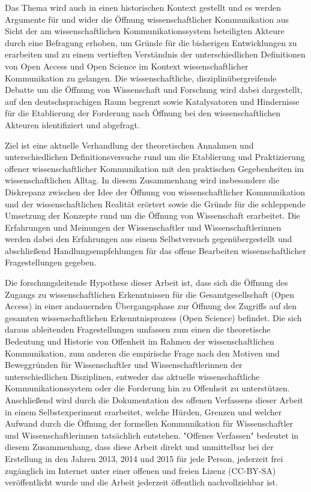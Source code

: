 Das Thema wird auch in einen historischen Kontext gestellt und es werden Argumente für und wider die Öffnung wissenschaftlicher Kommunikation aus Sicht der am wissenschaftlichen Kommunikationssystem beteiligten Akteure durch eine Befragung erhoben, um Gründe für die bisherigen Entwicklungen zu erarbeiten und zu einem vertieften Verständnis der unterschiedlichen Definitionen von Open Access und Open Science im Kontext wissenschaftlicher Kommunikation zu gelangen. Die wissenschaftliche, disziplinübergreifende Debatte um die Öffnung von Wissenschaft und Forschung wird dabei dargestellt, auf den deutschsprachigen Raum begrenzt sowie Katalysatoren und Hindernisse für die Etablierung der Forderung nach Öffnung bei den wissenschaftlichen Akteuren identifiziert und abgefragt.

Ziel ist eine aktuelle Verhandlung der theoretischen Annahmen und unterschiedlichen Definitionsversuche rund um die Etablierung und Praktizierung offener wissenschaftlicher Kommunikation mit den praktischen Gegebenheiten im wissenschaftlichen Alltag. In diesem Zusammenhang wird insbesondere die Diskrepanz zwischen der Idee der Öffnung von wissenschaftlicher Kommunikation und der wissenschaftlichen Realität \cite{Scheliga_2014} erörtert sowie die Gründe für die schleppende Umsetzung der Konzepte rund um die Öffnung von Wissenschaft erarbeitet. Die Erfahrungen und Meinungen der Wissenschaftler und Wissenschaftlerinnen werden dabei den Erfahrungen aus einem Selbstversuch gegenübergestellt und abschließend Handlungsempfehlungen für das offene Bearbeiten wissenschaftlicher Fragestellungen gegeben.

Die forschungsleitende Hypothese dieser Arbeit ist, dass sich die Öffnung des Zugangs zu wissenschaftlichen Erkenntnissen für die Gesamtgesellschaft (Open Access) in einer andauernden Übergangsphase zur Öffnung des Zugriffs auf den gesamten wissenschaftlichen Erkenntnisprozess (Open Science) befindet. Die sich daraus ableitenden Fragestellungen umfassen zum einen die theoretische Bedeutung und Historie von Offenheit im Rahmen der wissenschaftlichen Kommunikation, zum anderen die empirische Frage nach den Motiven und Beweggründen für Wissenschaftler und Wissenschaftlerinnen der unterschiedlichen Disziplinen, entweder das aktuelle wissenschaftliche Kommunikationssystem oder die Forderung hin zu Offenheit zu unterstützen. Anschließend wird durch die Dokumentation des offenen Verfassens dieser Arbeit in einem Selbstexperiment erarbeitet, welche Hürden, Grenzen und welcher Aufwand durch die Öffnung der formellen Kommunikation für Wissenschaftler und Wissenschaftlerinnen tatsächlich entstehen. "Offenes Verfassen" bedeutet in diesem Zusammenhang, dass diese Arbeit direkt und unmittelbar bei der Erstellung in den Jahren 2013, 2014 und 2015 für jede Person, jederzeit frei zugänglich im Internet unter einer offenen und freien Lizenz (CC-BY-SA) veröffentlicht wurde und die Arbeit jederzeit öffentlich nachvollziehbar ist.

